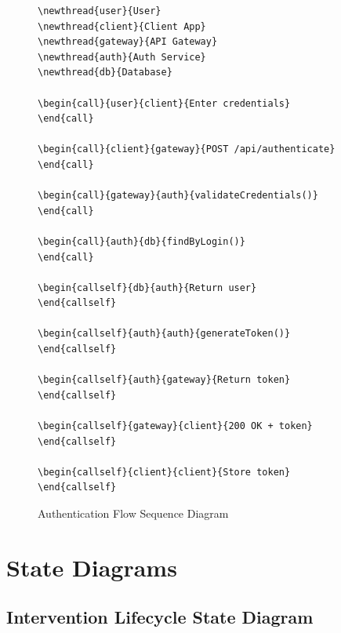 \begin{figure}[H]
\centering
\begin{lstlisting}
\newthread{user}{User}
\newthread{client}{Client App}
\newthread{gateway}{API Gateway}
\newthread{auth}{Auth Service}
\newthread{db}{Database}

\begin{call}{user}{client}{Enter credentials}
\end{call}

\begin{call}{client}{gateway}{POST /api/authenticate}
\end{call}

\begin{call}{gateway}{auth}{validateCredentials()}
\end{call}

\begin{call}{auth}{db}{findByLogin()}
\end{call}

\begin{callself}{db}{auth}{Return user}
\end{callself}

\begin{callself}{auth}{auth}{generateToken()}
\end{callself}

\begin{callself}{auth}{gateway}{Return token}
\end{callself}

\begin{callself}{gateway}{client}{200 OK + token}
\end{callself}

\begin{callself}{client}{client}{Store token}
\end{callself}
\end{lstlisting}
\caption{Authentication Flow Sequence Diagram}
\label{fig:auth_sequence}
\end{figure}

\section{State Diagrams}

\subsection{Intervention Lifecycle State Diagram}

